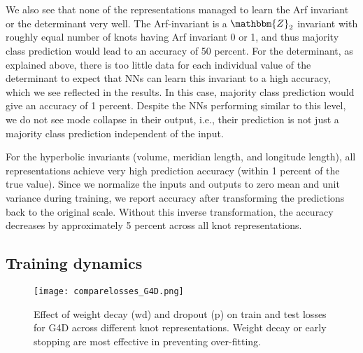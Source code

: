 \documentclass[11pt]{article}
\numberwithin{equation}{section}
\begin{document}
We also see that none of the representations managed to learn the Arf invariant or the determinant very well. The Arf-invariant is a $\mathbbm{Z}_2$ invariant with roughly equal number of knots having Arf invariant 0 or 1, and thus majority class prediction would lead to an accuracy of 50 percent. For the determinant, as explained above, there is too little data for each individual value of the determinant to expect that NNs can learn this invariant to a high accuracy, which we see reflected in the results. In this case, majority class prediction would give an accuracy of 1 percent. Despite the NNs performing similar to this level, we do not see mode collapse in their output, i.e., their prediction is not just a majority class prediction independent of the input.

For the hyperbolic invariants (volume, meridian length, and longitude length), all representations achieve very high prediction accuracy (within 1 percent of the true value). Since we normalize the inputs and outputs to zero mean and unit variance during training, we report accuracy after transforming the predictions back to the original scale. Without this inverse transformation, the accuracy decreases by approximately 5 percent across all knot representations. 


\subsection{Training dynamics}
\begin{figure}[t]
    \centering
    \texttt{[image: comparelosses\_G4D.png]}

\caption{Effect of weight decay (wd) and dropout (p) on train and test losses for G4D across different knot representations. Weight decay or early stopping are most effective in preventing over-fitting.}
\label{fig:G4Dloss}
\end{figure}
\end{document}
